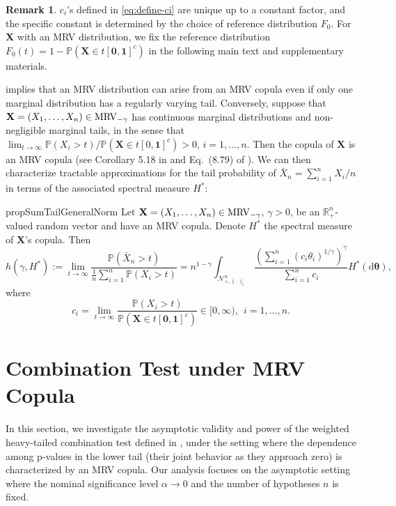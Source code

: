 \documentclass[12pt]{article}
\theoremstyle{plain}
\theoremstyle{plain}
\theoremstyle{definition}
\newtheorem{rem}{Remark}[section]
\renewcommand{\Pr}{\mathbb{P}}
\newcommand{\R}{\mathbb{R}}
\newcommand{\punitsphereone}[1]{\mathcal{N}_{+,\|\cdot\|_1}^{#1}}
\begin{document}
\begin{rem}
$c_i$'s defined in \eqref{eq:define-ci} are unique up to a constant factor, and the specific constant is determined by the choice of reference distribution $F_0$. For $\mathbf{X}$  with an MRV distribution, we fix the reference distribution $F_0(t)=1-\Pr(\mathbf{X}\in t[\mathbf{0},\mathbf{1}]^c)$ in the following main text and supplementary materials.
\end{rem}


 implies that an MRV distribution can arise from an MRV copula even if only one marginal distribution has a regularly varying tail. 
Conversely,  suppose that \({\bf X}=(X_1,\ldots,X_n)\in \mathrm{MRV}_{-\gamma}\) has
continuous marginal distributions and non-negligible marginal tails, in the sense that
$\lim_{t\to\infty}
    {\mathbb P(X_i>t)}/
         {\mathbb P(\mathbf{X}\in t[0,\mathbf 1]^c)}
    >0$,
     $   i=1,\ldots,n .$ 
Then   the copula of $\mathbf{X}$ is an MRV copula
(see Corollary 5.18 in \citet{resnick2008extreme} and Eq.~(8.79) of \citet{beirlant2006statistics}).  
We can then characterize tractable approximations for the tail probability of $\bar X_n = \sum_{i=1}^n X_i/n$ in terms of the associated spectral measure $H^*$:
\begin{restatable}{prop}{SumTailGeneralNorm}
\label{prop:sum-tail-general-norm}
Let $\mathbf{X}=(X_1,\dots,X_n)\in{\rm MRV}_{-\gamma}$, $\gamma>0$, be an $\R_+^n$-valued random vector and have an MRV copula. Denote $H^*$ the spectral measure of $\mathbf{X}$'s copula. 
Then
\begin{equation}
\label{eq:mrv-tail-general-norm}
h(\gamma,H^*):=\lim_{t\to\infty}\frac{\Pr(\bar X_n>t)}{\frac{1}{n}\sum_{i=1}^n\Pr(X_i>t)}
=n^{1-\gamma}\int_{\punitsphereone{n}}\frac{\left(\sum_{i=1}^n(c_i\theta_i)^{1/\gamma}\right)^\gamma}{\sum_{i=1}^nc_i} H^*(\mathrm{d}\bm{\theta}),
\end{equation}
where  
\[
c_i=\lim_{t\to\infty}\frac{\Pr(X_i>t)}{\Pr(\mathbf{X}\in t[\mathbf{0},\mathbf{1}]^c)}\in[0,\infty),~~i=1,\dots,n.
\]
\end{restatable}

\section{Combination Test under MRV Copula}
\label{sec:comb-test-under-mrv}
In this section, we investigate the asymptotic validity and power of the weighted heavy-tailed combination test defined in , under the setting where the dependence among p-values in the lower tail (their joint behavior as they approach zero) is characterized by an MRV copula. Our analysis focuses on the asymptotic setting where the nominal significance level $\alpha \to 0$ and the number of hypotheses $n$ is fixed.
\end{document}
